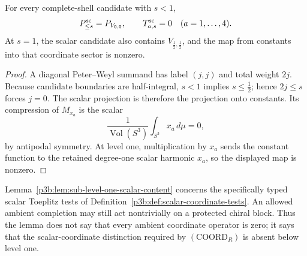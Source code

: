 \documentclass[11pt,a4paper]{article}
\begin{document}
\begin{lemma}
\label{p3b:lem:sub-level-one-scalar-content}
For every complete-shell candidate with \(s<1\),
\[
 P^{\rm sc}_{\le s}=P_{V_{0,0}},
 \qquad
 T^{\rm sc}_{a,s}=0
 \quad(a=1,\ldots,4).
\]
At \(s=1\), the scalar candidate also contains
\(V_{\frac12,\frac12}\), and the map from constants into that coordinate
sector is nonzero.
\end{lemma}

\begin{proof}
A diagonal Peter--Weyl summand has label \((j,j)\) and total weight \(2j\).
Because candidate boundaries are half-integral, \(s<1\) implies
\(s\le\tfrac12\); hence \(2j\le s\) forces \(j=0\).  The scalar projection
is therefore the projection onto constants.  Its compression of
\(M_{x_a}\) is the scalar
\[
 \frac{1}{\operatorname{Vol}(S^3)}
 \int_{S^3}x_a\,d\mu=0,
\]
by antipodal symmetry.  At level one, multiplication by \(x_a\) sends the
constant function to the retained degree-one scalar harmonic \(x_a\), so the
displayed map is nonzero.
\end{proof}

\begin{remark}
\label{p3b:rem:scalar-tests-not-ambient-zero}
Lemma~\ref{p3b:lem:sub-level-one-scalar-content} concerns the specifically
typed scalar Toeplitz tests of
Definition~\ref{p3b:def:scalar-coordinate-tests}.  An allowed ambient
completion may still act nontrivially on a protected chiral block.  Thus the
lemma does not say that every ambient coordinate operator is zero; it says
that the scalar-coordinate distinction required by \((\mathrm{COORD}_R)\)
is absent below level one.
\end{remark}
\end{document}
